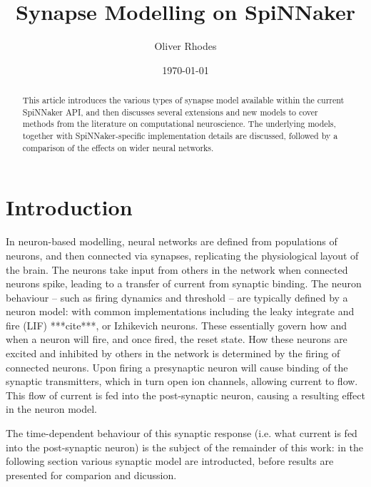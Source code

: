 \documentclass[12pt]{article}
\title{Synapse Modelling on SpiNNaker}
\author{Oliver Rhodes}
\date{\today}
\begin{document}
\maketitle

\begin{abstract}
This article introduces the various types of synapse model available within the
current SpiNNaker API, and then discusses several extensions and new models to
cover methods from the literature on computational neuroscience. The underlying
models, together with SpiNNaker-specific implementation details are discussed,
followed by a comparison of the effects on wider neural networks.
\end{abstract}

\section{Introduction}
In neuron-based modelling, neural networks are defined from populations of
neurons, and then connected via synapses, replicating the physiological layout
of the brain. The neurons take input from others in the network when connected
neurons spike, leading to a transfer of current from synaptic binding. The
neuron behaviour -- such as firing dynamics and threshold -- are typically
defined by a neuron model: with common implementations including the leaky
integrate and fire (LIF) ***cite***, or Izhikevich
\cite{SimpleModelofSpikingNeurons} neurons. These
essentially govern how and when a neuron will fire, and once fired, the reset
state. How these neurons are excited and inhibited by others in the network is
determined by the firing of connected neurons. Upon firing a presynaptic neuron
will cause binding of the synaptic transmitters, which in turn open ion
channels, allowing current to flow. This flow of current is fed into the
post-synaptic neuron, causing a resulting effect in the neuron model.

The time-dependent behaviour of this synaptic response (i.e. what current
is fed into the post-synaptic neuron) is the subject of the remainder of this
work: in the following section various synaptic model are introducted, before
results are presented for comparion and dicussion.
\end{document}
